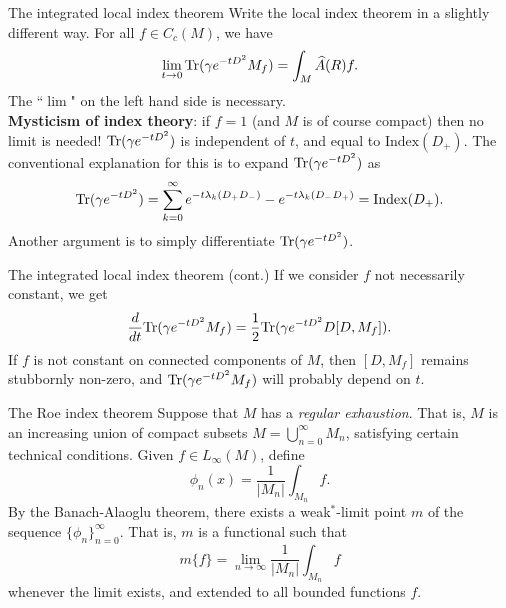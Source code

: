 \documentclass{beamer}
\numberwithin{equation}{section}
\theoremstyle{plain}
\theoremstyle{plain}
\theoremstyle{definition}
\theoremstyle{plain}
\theoremstyle{plain}
\theoremstyle{definition}
\newcommand{\tr}{{\rm Tr}}
\begin{document}
\begin{frame}{The integrated local index theorem}
    Write the local index theorem in a slightly different way. For all $f \in C_c(M)$, we have
    \begin{equation*}
        \lim_{t\to 0} \tr(\gamma e^{-tD^2}M_f) = \int_{M} \widehat{A}(R)f.
    \end{equation*}
    The ``$\lim$" on the left hand side is necessary.\\
    \pause
    \textbf{Mysticism of index theory}: if $f = 1$ (and $M$ is of course compact) then no limit is needed! $\tr(\gamma e^{-tD^2})$
    is independent of $t$, and equal to $\mathrm{Index}(D_+)$. The conventional explanation for this is to expand $\tr(\gamma e^{-tD^2})$ as
    \begin{equation*}
        \tr(\gamma e^{-tD^2}) = \sum_{k=0}^\infty e^{-t\lambda_k(D_+D_-)}-e^{-t\lambda_k(D_-D_+)} = \mathrm{Index}(D_+).
    \end{equation*}
    \pause
    Another argument is to simply differentiate $\tr(\gamma e^{-tD^2})$.
\end{frame}

\begin{frame}{The integrated local index theorem (cont.)}
    If we consider $f$ not necessarily constant, we get
    \begin{equation*}
        \frac{d}{dt}\tr(\gamma e^{-tD^2}M_f) = \frac{1}{2}\tr(\gamma e^{-tD^2}D[D,M_f]).
    \end{equation*}
    If $f$ is not constant on connected components of $M$, then $[D,M_f]$ remains stubbornly non-zero, and $\tr(\gamma e^{-tD^2}M_f)$
    will probably depend on $t$. 
\end{frame}

\begin{frame}{The Roe index theorem}
    Suppose that $M$ has a \emph{regular exhaustion}. That is, $M$ is an increasing union of compact subsets $M = \bigcup_{n=0}^\infty M_n$, satisfying certain technical conditions.
    Given $f\in L_\infty(M)$, define
    \begin{equation*}
        \phi_n(x) = \frac{1}{|M_n|}\int_{M_n} f.
    \end{equation*}
    By the Banach-Alaoglu theorem, there exists a weak$^*$-limit point $m$ of the sequence $\{\phi_n\}_{n=0}^\infty$. That is, $m$ is a functional such that
    \begin{equation*}
        m\{f\} = \lim_{n\to\infty} \frac{1}{|M_n|} \int_{M_n} f
    \end{equation*}
    whenever the limit exists, and extended to all bounded functions $f$.
\end{frame}
\end{document}
